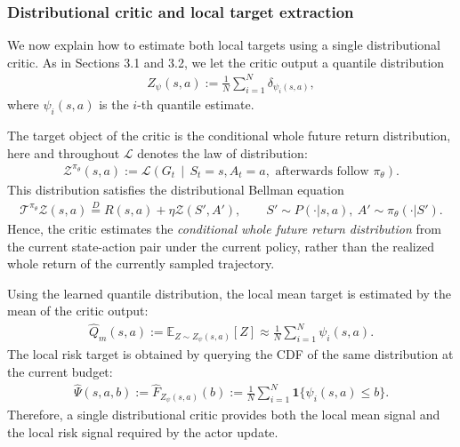 \subsubsection{Distributional critic and local target extraction}

We now explain how to estimate both local targets using a single distributional critic. As in Sections 3.1 and 3.2, we let the critic output a quantile distribution
\begin{align}
    Z_{\psi}(s,a)
    :=
    \frac{1}{N}\sum_{i=1}^{N}\delta_{\psi_i(s,a)},
\end{align}
where $\psi_i(s,a)$ is the $i$-th quantile estimate.

The target object of the critic is the conditional whole future return distribution, here and throughout $\mathcal{L}$ denotes the law of distribution:
\begin{align}
    \mathcal{Z}^{\pi_{\theta}}(s,a)
    :=
    \mathcal{L}\!\left(
        G_t
        \,\middle|\,
        S_t=s,A_t=a,\text{ afterwards follow }\pi_{\theta}
    \right).
\end{align}
This distribution satisfies the distributional Bellman equation
\begin{align}
    \mathcal{T}^{\pi_{\theta}}\mathcal{Z}(s,a)
    \overset{D}{=}
    R(s,a)+\eta \mathcal{Z}(S',A'),
    \qquad
    S'\sim P(\cdot|s,a),\ A'\sim \pi_{\theta}(\cdot|S').
\end{align}
Hence, the critic estimates the \emph{conditional whole future return distribution} from the current state-action pair under the current policy, rather than the realized whole return of the currently sampled trajectory.

Using the learned quantile distribution, the local mean target is estimated by the mean of the critic output:
\begin{align}\label{mean_from_distribution}
    \widehat{Q}_m(s,a)
    :=
    \mathbb{E}_{Z\sim Z_{\psi}(s,a)}[Z]
    \approx
    \frac{1}{N}\sum_{i=1}^{N}\psi_i(s,a).
\end{align}
The local risk target is obtained by querying the CDF of the same distribution at the current budget:
\begin{align}\label{risk_query}
    \widehat{\Psi}(s,a,b)
    :=
    \widehat{F}_{Z_{\psi}(s,a)}(b)
    :=
    \frac{1}{N}\sum_{i=1}^{N}\mathbf{1}\{\psi_i(s,a)\le b\}.
\end{align}
Therefore, a single distributional critic provides both the local mean signal and the local risk signal required by the actor update.

